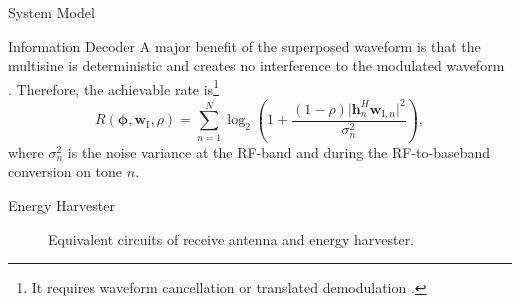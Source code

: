 \documentclass[journal]{IEEEtran}
\begin{document}
\begin{section}{System Model}
		\begin{subsection}{Information Decoder}
			A major benefit of the superposed waveform is that the multisine is deterministic and creates no interference to the modulated waveform \cite{Clerckx2018b}. Therefore, the achievable rate is\footnote{It requires waveform cancellation or translated demodulation \cite{Clerckx2018b}.}
			\begin{equation}\label{eq:R}
				R(\boldsymbol{\phi},\boldsymbol{w}_{\mathrm{I}},\rho) = \sum_{n=1}^N{\log_2\left(1+\frac{(1-\rho)\lvert \boldsymbol{h}_{n}^H\boldsymbol{w}_{\mathrm{I},n} \rvert^2}{\sigma_n^2}\right)},
			\end{equation}
			where $\sigma_n^2$ is the noise variance at the RF-band and during the RF-to-baseband conversion on tone $n$.
		\end{subsection}


		\begin{subsection}{Energy Harvester}\label{se:energy_harvester}
			\begin{figure}[!t]
				\centering
				\caption{Equivalent circuits of receive antenna and energy harvester.}
			\end{figure}


\end{subsection}
\end{section}
\end{document}
